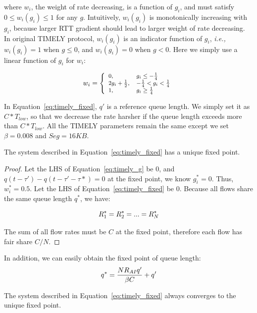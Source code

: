 where $w_i$, the weight of rate decreasing, is a function of $g_i$, and must satisfy $0 \le w_i(g_i) \le 1$ for any $g$. 
Intuitively, $w_i(g_i)$ is monotonically increasing with $g_i$, because larger RTT gradient should lead to larger 
weight of rate decreasing. In original TIMELY protocol, $w_i(g_i)$ is an indicator function of $g_i$, {\em i.e.,} 
$w_i(g_i)=1$ when $g \le 0$, and $w_i(g_i)=0$ when $g<0$. Here we simply use a linear function of $g_i$ for $w_i$:

\begin{equation}
\small
{w_i} = \left\{ \begin{array}{ll}
0, & {g_i \le  - \frac{1}{4}} \\
2{g_i} + \frac{1}{2}, & { - \frac{1}{4} < g_i < \frac{1}{4}} \\
1, & {g_i \ge \frac{1}{4}}
\end{array} \right.
\end{equation}

In Equation~\ref{eq:timely_fixed}, $q'$ is a reference queue length. We simply set it as $C*T_{low}$, 
so that we decrease the rate harsher if the queue length exceeds more than $C*T_{low}$. All the TIMELY
parameters remain the same except we set $\beta=0.008$ and $Seg=16KB$. 

\begin{thm}
The system described in Equation~\ref{eq:timely_fixed} has a unique fixed point.
\end{thm}
\begin{proof}
Let the LHS of Equation~\ref{eq:timely_g} be 0, and $q(t - \tau ') - q(t - \tau ' - \tau *) = 0$ at the fixed 
point, we know $g_i^*=0$. Thus, $w_i^*=0.5$. Let the LHS of Equation~\ref{eq:timely_fixed} be 0. Because
all flows share the same queue length $q^*$, we have:

\begin{equation}
\small
R_1^* = R_2^* = ... = R_N^*
\end{equation}

The sum of all flow rates must be $C$ at the fixed point, therefore each flow has fair share $C/N$. 
\end{proof}

In addition, we can easily obtain the fixed point of queue length:
\begin{equation}
\small
{q^*} = \frac{{N{R_{AI}}q'}}{{\beta C}} + q'
\label{eq:timely_fixed_q}
\end{equation}

\begin{thm}
The system described in Equation~\ref{eq:timely_fixed} always converges to the unique fixed point.
\end{thm}

